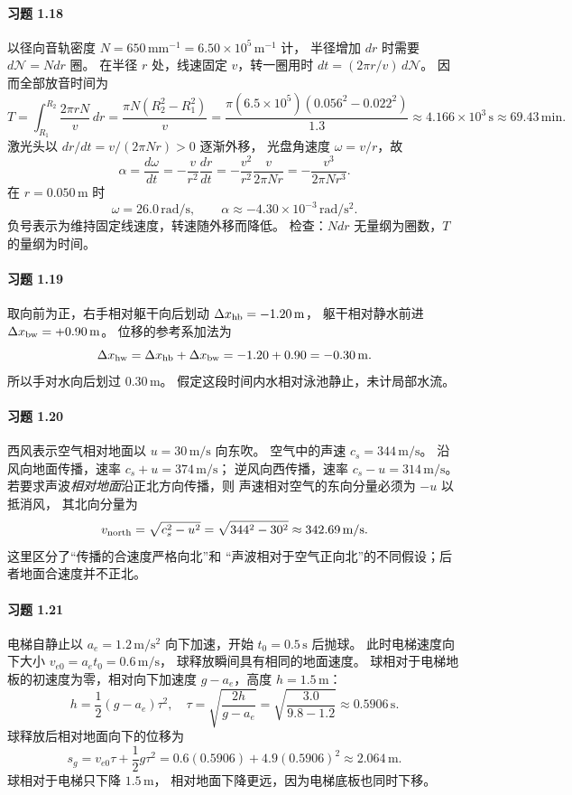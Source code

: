 \paragraph{习题 1.18}
以径向音轨密度 \(N=650\,\mathrm{mm^{-1}}
=6.50\times10^5\,\mathrm{m^{-1}}\) 计，
半径增加 \(dr\) 时需要 \(d\mathcal N=Ndr\) 圈。
在半径 \(r\) 处，线速固定 \(v\)，转一圈用时
\(dt=(2\pi r/v)\,d\mathcal N\)。
因而全部放音时间为
\[
 T=\int_{R_1}^{R_2}\frac{2\pi rN}{v}\,dr
 =\frac{\pi N(R_2^2-R_1^2)}{v}
 =\frac{\pi(6.5\times10^5)(0.056^2-0.022^2)}{1.3}
 \approx4.166\times10^3\,\mathrm s
 \approx69.43\,\mathrm{min}.
\]
激光头以 \(dr/dt=v/(2\pi Nr)>0\) 逐渐外移，
光盘角速度 \(\omega=v/r\)，故
\[
 \alpha=\frac{d\omega}{dt}
 =-\frac{v}{r^2}\frac{dr}{dt}
 =-\frac{v^2}{r^2}\frac{v}{2\pi Nr}
 =-\frac{v^3}{2\pi Nr^3}.
\]
在 \(r=0.050\,\mathrm m\) 时
\[
 \omega=26.0\,\mathrm{rad/s},\qquad
 \alpha\approx-4.30\times10^{-3}\,\mathrm{rad/s^2}.
\]
负号表示为维持固定线速度，转速随外移而降低。
检查：\(Ndr\) 无量纲为圈数，\(T\) 的量纲为时间。

\paragraph{习题 1.19}
取向前为正，右手相对躯干向后划动
\(\Delta x_{\rm hb}=-1.20\,\mathrm m\)，
躯干相对静水前进
\(\Delta x_{\rm bw}=+0.90\,\mathrm m\)。
位移的参考系加法为
\[
 \Delta x_{\rm hw}
 =\Delta x_{\rm hb}+\Delta x_{\rm bw}
 =-1.20+0.90=-0.30\,\mathrm m.
\]
所以手对水向后划过 \(0.30\,\mathrm m\)。
假定这段时间内水相对泳池静止，未计局部水流。

\paragraph{习题 1.20}
西风表示空气相对地面以
\(u=30\,\mathrm{m/s}\) 向东吹。
空气中的声速 \(c_s=344\,\mathrm{m/s}\)。
沿风向地面传播，速率 \(c_s+u=374\,\mathrm{m/s}\)；
逆风向西传播，速率 \(c_s-u=314\,\mathrm{m/s}\)。
若要求声波\emph{相对地面}沿正北方向传播，则
声速相对空气的东向分量必须为 \(-u\) 以抵消风，
其北向分量为
\[
 v_{\rm north}=\sqrt{c_s^2-u^2}
 =\sqrt{344^2-30^2}
 \approx342.69\,\mathrm{m/s}.
\]
这里区分了“传播的合速度严格向北”和
“声波相对于空气正向北”的不同假设；后者地面合速度并不正北。

\paragraph{习题 1.21}
电梯自静止以 \(a_e=1.2\,\mathrm{m/s^2}\)
向下加速，开始 \(t_0=0.5\,\mathrm s\) 后抛球。
此时电梯速度向下大小 \(v_{e0}=a_et_0=0.6\,\mathrm{m/s}\)，
球释放瞬间具有相同的地面速度。
球相对于电梯地板的初速度为零，相对向下加速度
\(g-a_e\)，高度 \(h=1.5\,\mathrm m\)：
\[
 h=\frac12(g-a_e)\tau^2,\quad
 \tau=\sqrt{\frac{2h}{g-a_e}}
 =\sqrt{\frac{3.0}{9.8-1.2}}
 \approx0.5906\,\mathrm s.
\]
球释放后相对地面向下的位移为
\[
 s_g=v_{e0}\tau+\frac12g\tau^2
 =0.6(0.5906)+4.9(0.5906)^2
 \approx2.064\,\mathrm m.
\]
球相对于电梯只下降 \(1.5\,\mathrm m\)，
相对地面下降更远，因为电梯底板也同时下移。

